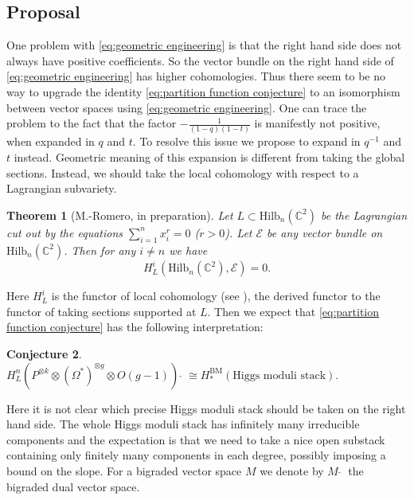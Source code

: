 \documentclass[12pt]{amsart}
\newtheorem{theorem}{Theorem}[section]
\theoremstyle{definition}
\newtheorem{conjecture}[theorem]{Conjecture}
\theoremstyle{remark}
\numberwithin{equation}{section}
\begin{document}
	\subsection{Proposal}
	One problem with \eqref{eq:geometric engineering} is that the right hand side does not always have positive coefficients. So the vector bundle on the right hand side of \eqref{eq:geometric engineering} has higher cohomologies. Thus there seem to be no way to upgrade the identity \eqref{eq:partition function conjecture} to an isomorphism between vector spaces using \eqref{eq:geometric engineering}. One can trace the problem to the fact that the factor $-\frac{1}{(1-q)(1-t)}$ is manifestly not positive, when expanded in $q$ and $t$. To resolve this issue we propose to expand in $q^{-1}$ and $t$ instead. Geometric meaning of this expansion is different from taking the global sections. Instead, we should take the local cohomology with respect to a Lagrangian subvariety.
	
	\begin{theorem}[M.-Romero, in preparation]
		Let $L\subset \mathrm{Hilb}_n(\mathbb{C}^2)$ be the Lagrangian cut out by the equations $\sum_{i=1}^n x_i^r=0$ ($r>0$). Let $\mathcal{E}$ be any vector bundle on $\mathrm{Hilb}_n(\mathbb{C}^2)$. Then for any $i\neq n$ we have
		\[
		H^i_L(\mathrm{Hilb}_n(\mathbb{C}^2), \mathcal{E})=0.
		\]
	\end{theorem}
	Here $H^i_L$ is the functor of local cohomology (see \cite{hartshorne1967local}), the derived functor to the functor of taking sections supported at $L$. Then we expect that \eqref{eq:partition function conjecture} has the following interpretation:
	\begin{conjecture}
		$
		H^n_L(P^{\otimes k} \otimes (\Omega^{*})^{\otimes g}\otimes O(g-1))\;\check{}\; \cong H_*^{\mathrm{BM}}(\text{Higgs moduli stack}).
		$
	\end{conjecture}
	Here it is not clear which precise Higgs moduli stack should be taken on the right hand side. The whole Higgs moduli stack has infinitely many irreducible components and the expectation is that we need to take a nice open substack containing only finitely many components in each degree, possibly imposing a bound on the slope. For a bigraded vector space $M$ we denote by $M\;\check{}\;$ the bigraded dual vector space.
	
\end{document}
